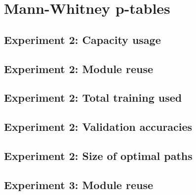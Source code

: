 \chapter{Mann-Whitney p-tables}

\section{Experiment 2: Capacity usage}
\label{appendix:ptable.capacity}


\section{Experiment 2: Module reuse}
\label{appendix:ptable.reuse}


\newpage
\section{Experiment 2: Total training used}
\label{appendix:ptable.training}


\section{Experiment 2: Validation accuracies}
\label{appendix:ptable.accuracy}


\section{Experiment 2: Size of optimal paths}
\label{appendix:ptable.pathsize}


\section{Experiment 3: Module reuse}
